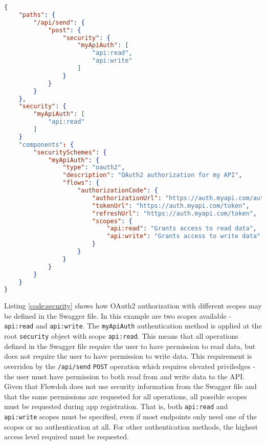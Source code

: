 \begin{lstlisting}[caption={OAuth2 authorization code flow defined in the Swagger file},label={code:security},language=json]
{
    "paths": {
        "/api/send": {
            "post": {
                "security": {
                    "myApiAuth": [
                        "api:read",
                        "api:write"
                    ]
                }
            }
        }
    },
    "security": {
        "myApiAuth": [
            "api:read"
        ]
    }
    "components": {
        "securitySchemes": {
            "myApiAuth": {
                "type": "oauth2",
                "description": "OAuth2 authorization for my API",
                "flows": {
                    "authorizationCode": {
                        "authorizationUrl": "https://auth.myapi.com/authorize",
                        "tokenUrl": "https://auth.myapi.com/token",
                        "refreshUrl": "https://auth.myapi.com/token",
                        "scopes": {
                            "api:read": "Grants access to read data",
                            "api:write": "Grants access to write data"
                        }
                    }
                }
            }
        }
    }
}
\end{lstlisting}
Listing \ref{code:security} shows how OAuth2 authorization with different scopes may be defined in the Swagger file. In this example are two scopes available - \texttt{api:read} and \texttt{api:write}. The \texttt{myApiAuth} authentication method is applied at the root \texttt{security} object with scope \texttt{api:read}. This means that all operations defined in the Swagger file require the user to have permission to read data, but does not require the user to have permission to write data. This requirement is overriden by the \texttt{/api/send} \texttt{POST} operation which requires elevated priviledges - the user must have permission to both read from and write data to the API. Given that Flowdoh does not use security information from the Swagger file and that the same permissions are requested for all operations, all possible scopes must be requested during app registration. That is, both \texttt{api:read} and \texttt{api:write} scopes must be specified, even if most endpoints only need one of the scopes or no authentication at all. For other authentication methods, the highest access level required must be requested.